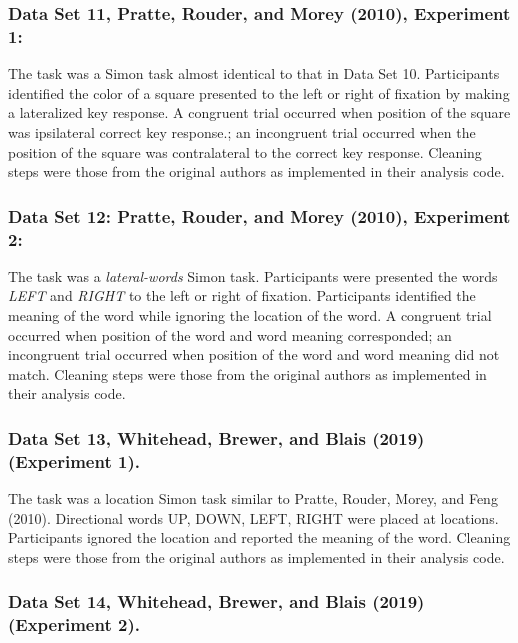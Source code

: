 \documentclass[
  english,
  ,man]{apa6}
\begin{document}
\hypertarget{data-set-11-pratteetal2010-experiment-1}{%
\subsubsection{Data Set 11, Pratte, Rouder, and Morey (2010), Experiment 1:}\label{data-set-11-pratteetal2010-experiment-1}}

The task was a Simon task almost identical to that in Data Set 10. Participants identified the color of a square presented to the left or right of fixation by making a lateralized key response. A congruent trial occurred when position of the square was ipsilateral correct key response.; an incongruent trial occurred when the position of the square was contralateral to the correct key response. Cleaning steps were those from the original authors as implemented in their analysis code.

\hypertarget{data-set-12-pratteetal2010-experiment-2}{%
\subsubsection{Data Set 12: Pratte, Rouder, and Morey (2010), Experiment 2:}\label{data-set-12-pratteetal2010-experiment-2}}

The task was a \emph{lateral-words} Simon task. Participants were presented the words \emph{LEFT} and \emph{RIGHT} to the left or right of fixation. Participants identified the meaning of the word while ignoring the location of the word. A congruent trial occurred when position of the word and word meaning corresponded; an incongruent trial occurred when position of the word and word meaning did not match. Cleaning steps were those from the original authors as implemented in their analysis code.

\hypertarget{data-set-13-whitehead.etal.2019-experiment-1.}{%
\subsubsection{Data Set 13, Whitehead, Brewer, and Blais (2019) (Experiment 1).}\label{data-set-13-whitehead.etal.2019-experiment-1.}}

The task was a location Simon task similar to Pratte, Rouder, Morey, and Feng (2010). Directional words UP, DOWN, LEFT, RIGHT were placed at locations. Participants ignored the location and reported the meaning of the word. Cleaning steps were those from the original authors as implemented in their analysis code.

\hypertarget{data-set-14-whitehead.etal.2019-experiment-2.}{%
\subsubsection{Data Set 14, Whitehead, Brewer, and Blais (2019) (Experiment 2).}\label{data-set-14-whitehead.etal.2019-experiment-2.}}
\end{document}
